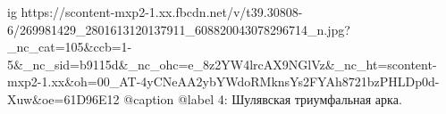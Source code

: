  
 
 
 
 

\ifcmt
  ig https://scontent-mxp2-1.xx.fbcdn.net/v/t39.30808-6/269981429_2801613120137911_608820043078296714_n.jpg?_nc_cat=105&ccb=1-5&_nc_sid=b9115d&_nc_ohc=e_8z2YW4lrcAX9NGlVz&_nc_ht=scontent-mxp2-1.xx&oh=00_AT-4yCNeAA2ybYWdoRMknsYs2FYAh8721bzPHLDp0d-Xuw&oe=61D96E12
  @caption @label 4: Шулявская триумфальная арка.
\fi
